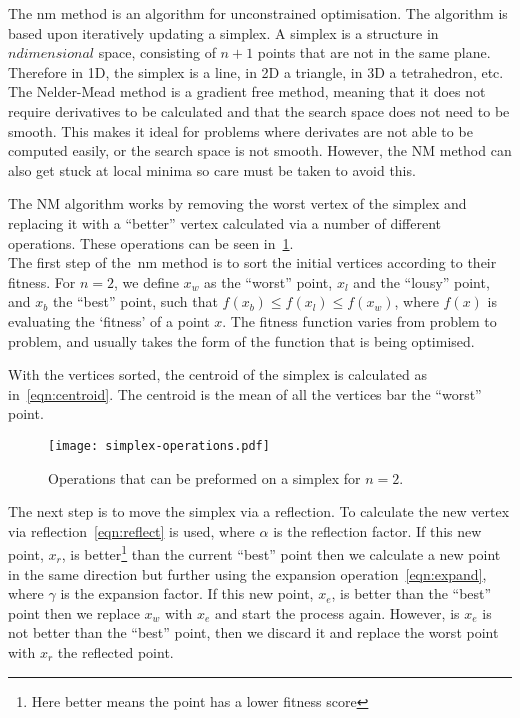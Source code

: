 The \gls*{nm} method is an algorithm for unconstrained optimisation. 
The algorithm is based upon iteratively updating a simplex. 
A simplex is a structure in $n dimensional$ space, consisting of $n+1$ points that are not in the same plane. 
Therefore in 1D, the simplex is a line, in 2D a triangle, in 3D a tetrahedron, etc. 
The Nelder-Mead method is a gradient free method, meaning that it does not require derivatives to be calculated and that the search space does not need to be smooth.
This makes it ideal for problems where derivates are not able to be computed easily, or the search space is not smooth.
However, the NM method can also get stuck at local minima so care must be taken to avoid this.

The NM algorithm works by removing the worst vertex of the simplex and replacing it with a ``better'' vertex calculated via a number of different operations.
These operations can be seen in~\cref{fig:NM-operations}.\\

The first step of the~\gls*{nm} method is to sort the initial vertices according to their fitness.
For $n=2$, we define $x_w$ as the ``worst'' point, $x_l$ and the ``lousy'' point, and $x_b$ the ``best'' point, such that $f(x_b)\leq f(x_l)\leq f(x_w)$, where $f(x)$ is evaluating the `fitness' of a point $x$. 
The fitness function varies from problem to problem, and usually takes the form of the function that is being optimised.

With the vertices sorted, the centroid of the simplex is calculated as in~\cref{eqn:centroid}.
The centroid is the mean of all the vertices bar the ``worst'' point.

\begin{figure}[!htbp]
    \centering
    \texttt{[image: simplex-operations.pdf]}
    \caption{Operations that can be preformed on a simplex for $n=2$.}
    \label{fig:NM-operations}
\end{figure}

The next step is to move the simplex via a reflection.
To calculate the new vertex via reflection~\cref{eqn:reflect} is used, where $\alpha$ is the reflection factor.
If this new point, $x_r$, is better\footnote{Here better means the point has a lower fitness score} than the current ``best'' point then we calculate a new point in the same direction but further using the expansion operation~\cref{eqn:expand}, where $\gamma$ is the expansion factor.
If this new point, $x_e$, is better than the ``best'' point then we replace $x_w$ with $x_e$ and start the process again.
However, is $x_e$ is not better than the ``best'' point, then we discard it and replace the worst point with $x_r$ the reflected point.

